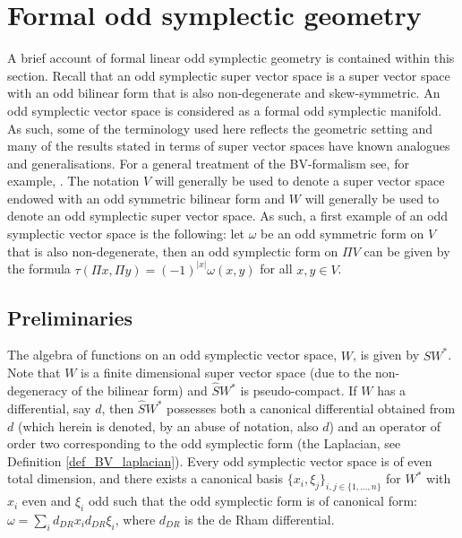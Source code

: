 \documentclass[]{amsart}
\theoremstyle{definition}
\begin{document}
\section{Formal odd symplectic geometry}\label{sec_formal_geo}

A brief account of formal linear odd symplectic geometry is contained within this section. Recall that an odd symplectic super vector space is a super vector space with an odd bilinear form that is also non-degenerate and skew-symmetric. An odd symplectic vector space is considered as a formal odd symplectic manifold. As such, some of the terminology used here reflects the geometric setting and many of the results stated in terms of super vector spaces have known analogues and generalisations. For a general treatment of the BV-formalism see, for example, \cite{khudaverdian_geometry_of_superspace,khudaverdian_BV_and_odd_symp_geo,khudaverdian_nersessian,schwarz}. The notation $V$ will generally be used to denote a super vector space endowed with an odd symmetric bilinear form and $W$ will generally be used to denote an odd symplectic super vector space. As such, a first example of an odd symplectic vector space is the following: let $\omega$ be an odd symmetric form on $V$ that is also non-degenerate, then an odd symplectic form on $\Pi V$ can be given by the formula $\tau (\Pi x, \Pi y)=(-1)^{|x|}\omega (x,y)$ for all $x,y\in V$.

\subsection{Preliminaries}

The algebra of functions on an odd symplectic vector space, $W$, is given by $\hat{S} W^*$. Note that $W$ is a finite dimensional super vector space (due to the non-degeneracy of the bilinear form) and $\hat{S} W^*$ is pseudo-compact. If $W$ has a differential, say $d$, then $\hat{S} W^*$ possesses both a canonical differential obtained from $d$ (which herein is denoted, by an abuse of notation, also $d$) and an operator of order two corresponding to the odd symplectic form (the Laplacian, see Definition \ref{def_BV_laplacian}). Every odd symplectic vector space is of even total dimension, and there exists a canonical basis $\lbrace x_i ,\xi_j \rbrace_{i,j \in\lbrace 1,\dots,n\rbrace}$ for $W^*$ with $x_i$ even and $\xi_i$ odd such that the odd symplectic form is of canonical form: $\omega = \sum_i d_{DR} x_i d_{DR} \xi_i$, where $d_{DR}$ is the de Rham differential.
\end{document}
